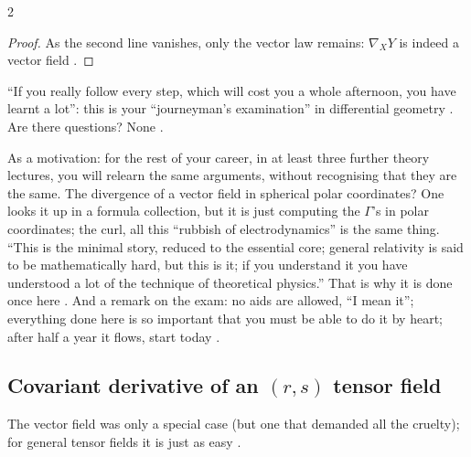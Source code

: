\begin{paracol}{2}
\begin{proof}
As the second line vanishes, only the vector law remains: $\nabla_XY$ is indeed a vector field .
\end{proof}
``If you really follow every step, which will cost you a whole afternoon, you have learnt a lot'': this is your ``journeyman's
examination'' in differential geometry . Are there questions? None .

\begin{aside}
As a motivation: for the rest of your career, in at least three further theory lectures, you will relearn the same arguments, without
recognising that they are the same. The divergence of a vector field in spherical polar coordinates? One looks it up in a formula
collection, but it is just computing the $\Gamma$'s in polar coordinates; the curl, all this ``rubbish of electrodynamics'' is the same
thing. ``This is the minimal story, reduced to the essential core; general relativity is said to be mathematically hard, but this
is it; if you understand it you have understood a lot of the technique of theoretical physics.'' That is why it is done once here
. And a remark on the exam: no aids are allowed, ``I mean it''; everything done here is so important that you must
be able to do it by heart; after half a year it flows, start today .
\end{aside}

\subsection{Covariant derivative of an $(r,s)$ tensor field}\label{ssec:cf-tensor}

The vector field was only a special case (but one that demanded all the cruelty); for general tensor fields it is just as easy
.


\end{paracol}
